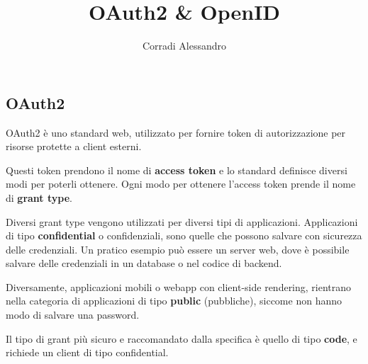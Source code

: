 \documentclass[11pt]{style}
\title{OAuth2 \& OpenID}
\author{Corradi Alessandro}
\begin{document}



\subsection{OAuth2}
OAuth2 è uno standard web, utilizzato per fornire token di autorizzazione per risorse protette
a client esterni.

Questi token prendono il nome di \textbf{access token} e lo standard definisce diversi modi per
poterli ottenere.
Ogni modo per ottenere l'access token prende il nome di \textbf{grant type}.

Diversi grant type vengono utilizzati per diversi tipi di applicazioni.
Applicazioni di tipo \textbf{confidential} o confidenziali, sono quelle
che possono salvare con sicurezza delle credenziali.
Un pratico esempio può essere un server web, dove è possibile salvare delle
credenziali in un database o nel codice di backend.

Diversamente, applicazioni mobili o webapp con client-side rendering, rientrano
nella categoria di applicazioni
di tipo \textbf{public} (pubbliche), siccome non hanno modo di salvare una password.


Il tipo di grant più sicuro e raccomandato dalla specifica è quello di tipo \textbf{code},
e richiede un client di tipo confidential.
\end{document}
